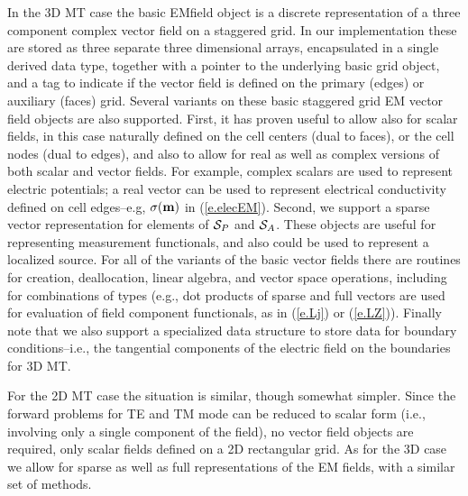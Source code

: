 In the 3D MT case the basic EMfield object is a discrete representation
of a three component complex vector field on a staggered grid.
In our implementation these are stored
as three separate three dimensional arrays, encapsulated in a single
derived data type, together with a 
pointer to the underlying basic grid object,
and a tag to indicate if the vector field is defined
on the primary (edges) or auxiliary (faces) grid. 
Several variants on these basic staggered grid EM vector field
objects are also supported.  First, it has proven useful to allow
also for scalar fields, in this case naturally defined on the cell
centers (dual to faces), or the cell nodes (dual to edges),
and also to allow for real as well as complex versions 
of both scalar and vector fields.   
For example, complex scalars are used to represent electric potentials;
a real vector can be used to represent electrical conductivity
defined on cell edges--e.g, $\sigma({\bf m})$ in (\ref{e.elecEM}).
Second, we support a sparse vector representation for elements
of ${\cal S}_P$ and ${\cal S}_A$.
These objects are useful for
representing measurement functionals, and also could be
used to represent a localized source.  For all of the variants of
the basic vector fields there are routines for creation, deallocation,
linear algebra, and vector space operations, including for combinations
of types (e.g., dot products of sparse and full vectors
are used for evaluation of field component functionals,
as in (\ref{e.Lj}) or (\ref{e.LZ})).
Finally note that we also support a specialized data structure to
store data for boundary conditions--i.e., the tangential components of
the electric field on the boundaries for 3D MT.

For the 2D MT case the situation is similar, though somewhat simpler.  
Since the forward problems for TE and TM mode can be reduced to
scalar form (i.e., involving only a single component of the field),
no vector field objects are required, only scalar fields defined
on a 2D rectangular grid.  As for the 3D case
we allow for sparse as well as full representations
of the EM fields, with a similar set of methods.

